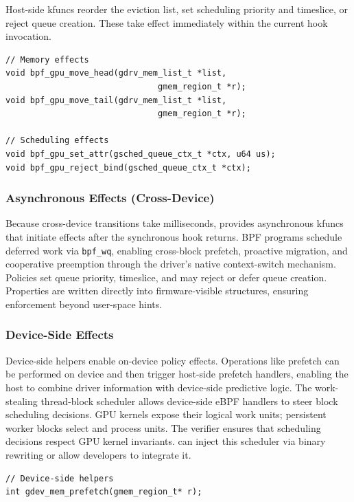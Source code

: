 Host-side kfuncs reorder the eviction list, set scheduling priority and timeslice, or reject queue creation. These take effect immediately within the current hook invocation.

\begin{lstlisting}
// Memory effects
void bpf_gpu_move_head(gdrv_mem_list_t *list,
                               gmem_region_t *r);
void bpf_gpu_move_tail(gdrv_mem_list_t *list,
                               gmem_region_t *r);

// Scheduling effects
void bpf_gpu_set_attr(gsched_queue_ctx_t *ctx, u64 us);
void bpf_gpu_reject_bind(gsched_queue_ctx_t *ctx);
\end{lstlisting}

\subsubsection{Asynchronous Effects (Cross-Device)}

Because cross-device transitions take milliseconds, \sys provides asynchronous kfuncs that initiate effects after the synchronous hook returns. BPF programs schedule deferred work via \texttt{bpf\_wq}, enabling cross-block prefetch, proactive migration, and cooperative preemption through the driver's native context-switch mechanism. Policies set queue priority, timeslice, and may reject or defer queue creation. Properties are written directly into firmware-visible structures, ensuring enforcement beyond user-space hints.

\subsubsection{Device-Side Effects}

Device-side helpers enable on-device policy effects. Operations like prefetch can be performed on device and then trigger host-side prefetch handlers, enabling the host to combine driver information with device-side predictive logic. The work-stealing thread-block scheduler allows device-side eBPF handlers to steer block scheduling decisions. GPU kernels expose their logical work units; persistent worker blocks select and process units. The verifier ensures that scheduling decisions respect GPU kernel invariants. \sys can inject this scheduler via binary rewriting or allow developers to integrate it.

\begin{lstlisting}
// Device-side helpers
int gdev_mem_prefetch(gmem_region_t* r);
\end{lstlisting}

